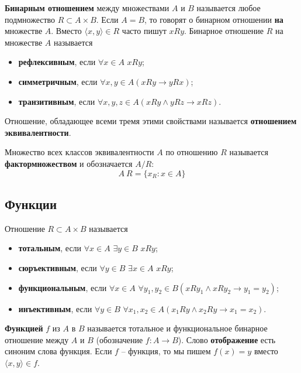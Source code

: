\begin{definition}\textbf{Бинарным отношением} между множествами $A$ и $B$ называется любое подмножество $R \subset A
\times B$. Если $A = B$, то говорят о бинарном отношении \textbf{на} множестве $A$. Вместо $\langle x, y \rangle
\in R$ часто пишут $xRy$. Бинарное отношение $R$ на множестве $A$ называется
\begin{itemize}
	\item \textbf{рефлексивным}, если $ \forall x \in A$ $xRy$;

	\item \textbf{симметричным}, если $\forall x,y \in A (xRy \rightarrow yRx)$;

	\item \textbf{транзитивным}, если $\forall x,y,z \in A (xRy \land yRz \rightarrow xRz)$.
\end{itemize}
Отношение, обладающее всеми тремя этими свойствами называется \textbf{отношением эквивалентности}.
\end{definition}

\begin{definition}Множество всех классов эквивалентности $A$ по отношению $R$ называется \textbf{фактормножеством} и
обозначается $A / R$:
$$ A \ R = \{ x_R : x \in A \} $$
\end{definition}

\subsection{Функции}

\begin{definition}Отношение $R \subset A \times B$ называется
\begin{itemize}
	\item \textbf{тотальным}, если $ \forall x \in A$ $\exists y \in B$ $xRy$;

	\item \textbf{сюръективным}, если $ \forall y \in B$ $\exists x \in A$ $xRy$;

	\item \textbf{функциональным}, если $ \forall x \in A$ $\forall y_1, y_2 \in B (xRy_1 \land xRy_2 \rightarrow
y_1 = y_2)$;

	\item \textbf{инъективным}, если $ \forall y \in B$ $\forall x_1, x_2 \in A (x_1 Ry \land x_2 Ry \rightarrow
x_1 = x_2)$.
\end{itemize}
\textbf{Функцией} $f$ из $A$ в $B$ называется тотальное и функциональное бинарное отношение между $A$ и $B$
(обозначение $f : A \rightarrow B$). Слово \textbf{отображение} есть синоним слова функция. Если $f$ -- функция, то
мы пишем $f (x) = y$ вместо $\langle x, y \rangle \in f$.
\end{definition}
